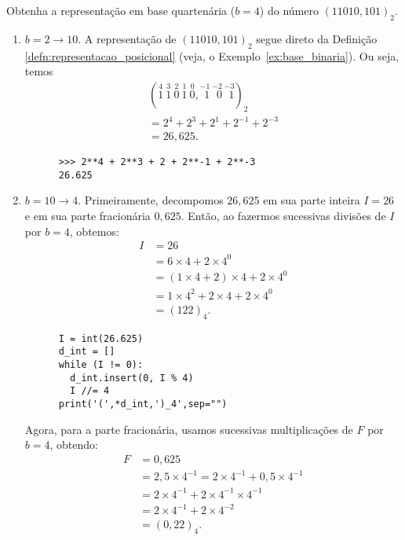 \begin{ex}
  Obtenha a representação em base quartenária ($b=4$) do número $(11010,101)_2$.
  \begin{enumerate}[1.]
  \item $b=2 \to 10$. 
    A representação de $(11010,101)_2$ segue direto da Definição \ref{defn:representacao_posicional} (veja, o Exemplo~\ref{ex:base_binaria}). Ou seja, temos
    \begin{gather}
      (\stackrel{4}{1}~\stackrel{3}{1}~\stackrel{2}{0}~\stackrel{1}{1}~\stackrel{0}{0},\stackrel{-1}{~\,1}~\stackrel{-2}{~\,0}~\stackrel{-3}{~\,1})_2 \\
      = 2^4 + 2^3 + 2^1 + 2^{-1} + 2^{-3} \\
      = 26,625.
    \end{gather}

    \begin{lstlisting}
      >>> 2**4 + 2**3 + 2 + 2**-1 + 2**-3
      26.625
    \end{lstlisting}

  \item $b=10 \to 4$.
    Primeiramente, decompomos $26,625$ em sua parte inteira $I = 26$ e em sua parte fracionária $0,625$. Então, ao fazermos sucessivas divisões de $I$ por $b=4$, obtemos:
    \begin{align}
      I &= 26\\
        &= 6\times 4 + 2\times 4^0\\
        &= (1\times 4 + 2)\times 4 + 2\times 4^0\\
        &= 1\times 4^2 + 2\times 4 + 2\times 4^0\\
        &= (122)_4.
    \end{align}

    \begin{lstlisting}
      I = int(26.625)
      d_int = []
      while (I != 0):
        d_int.insert(0, I % 4)
        I //= 4
      print('(',*d_int,')_4',sep="")
    \end{lstlisting}
    
    Agora, para a parte fracionária, usamos sucessivas multiplicações de $F$ por $b=4$, obtendo:
    \begin{align}
      F &= 0,625\\
        &= 2,5\times 4^{-1} = 2\times 4^{-1} + 0,5\times 4^{-1}\\
        &= 2\times 4^{-1} + 2\times 4^{-1}\times 4^{-1}\\
        &= 2\times 4^{-1} + 2\times 4^{-2}\\
        &= (0,22)_{4}.
    \end{align}


\end{enumerate}
\end{ex}
